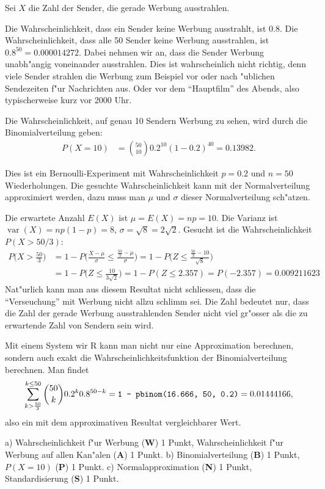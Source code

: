 \begin{loesung}
Sei $X$ die Zahl der Sender, die gerade Werbung ausstrahlen.
\begin{teilaufgaben}
\item
Die Wahrscheinlichkeit, dass ein Sender keine Werbung ausstrahlt, ist
$0.8$. Die Wahrscheinlichkeit, dass alle 50 Sender keine Werbung
ausstrahlen, ist $0.8^{50}=0.000014272$.
Dabei nehmen wir an, dass die Sender Werbung unabh"angig voneinander 
ausstrahlen. Dies ist wahrscheinlich nicht richtig, denn viele Sender
strahlen die Werbung zum Beispiel vor oder nach "ublichen Sendezeiten
f"ur Nachrichten aus. Oder vor dem ``Hauptfilm'' des Abends, also
typischerweise kurz vor 2000 Uhr.
\item
Die Wahrscheinlichkeit, auf genau 10 Sendern Werbung zu sehen, wird durch
die Binomialverteilung geben: 
\begin{align*}
P(X=10)&=\binom{50}{10}0.2^{10}(1-0.2)^{40}=0.13982.
\end{align*}
\item
Dies ist ein Bernoulli-Experiment mit Wahrscheinlichkeit $p=0.2$
und $n=50$ Wiederholungen. Die gesuchte Wahrscheinlichkeit kann mit
der Normalverteilung approximiert werden, dazu muss man $\mu$ und
$\sigma$ dieser Normalverteilung sch"atzen.

Die erwartete Anzahl $E(X)$ ist $\mu=E(X)=np=10$. Die Varianz ist
$\operatorname{var}(X)=np(1-p)=8$, $\sigma=\sqrt{8}=2\sqrt{2}$.
Gesucht ist die Wahrscheinlichkeit $P(X>50/3)$:
\begin{align*}
P\biggl(
X>\frac{50}3
\biggr)
&=
1-P\biggl(
\frac{X-\mu}{\sigma}\le \frac{\frac{50}3-\mu}{\sigma}
\biggr)
=
1-P\biggl(
Z\le \frac{\frac{50}3-10}{\sqrt{8}}
\biggr)
\\
&=
1-P\biggl(
Z\le \frac{10}{3\sqrt{2}}
\biggr)
=
1-P(Z\le 2.357) = P(-2.357) = 0.009211623
\end{align*}
Nat"urlich kann man aus diesem Resultat nicht schliessen, dass 
die ``Verseuchung'' mit Werbung nicht allzu schlimm sei.
Die Zahl bedeutet nur, dass die Zahl der gerade Werbung ausstrahlenden
Sender nicht viel gr"osser als die zu erwartende Zahl von Sendern
sein wird.

Mit einem System wir R kann man nicht nur eine Approximation berechnen,
sondern auch exakt die Wahrscheinlichkeitsfunktion der Binomialverteilung
berechnen. Man findet
\[
\sum_{k>\frac{50}3}^{k\le 50}\binom{50}{k}0.2^k0.8^{50-k}
=
\text{\tt 1 - pbinom(16.666, 50, 0.2)}
=0.01444166,
\]
also ein mit dem approximativen Resultat vergleichbarer Wert.
\end{teilaufgaben}
\end{loesung}

\begin{bewertung}
a) Wahrscheinlichkeit f"ur Werbung ({\bf W}) 1 Punkt,
Wahrscheinlichkeit f"ur Werbung auf allen Kan"alen ({\bf A}) 1 Punkt.
b) Binomialverteilung ({\bf B}) 1 Punkt, $P(X=10)$ ({\bf P}) 1 Punkt.
c) Normalapproximation ({\bf N}) 1 Punkt, Standardisierung ({\bf S}) 1 Punkt.
\end{bewertung}
